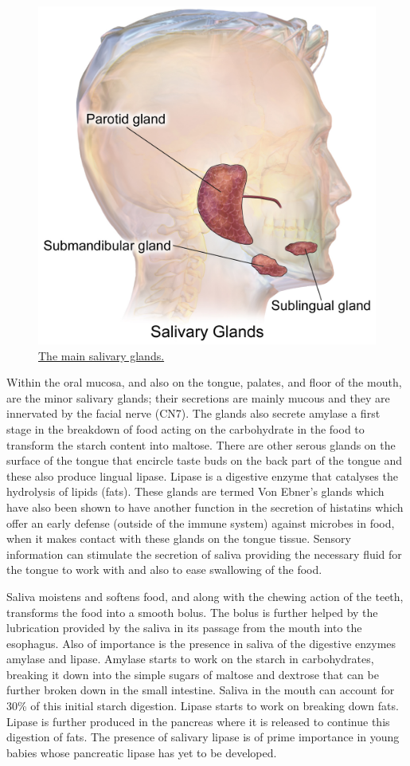 \begin{figure}

{\centering \includegraphics[width=0.7\linewidth]{./figures/digestive/Blausen_0780_SalivaryGlands} 

}

\caption{\href{https://en.wikipedia.org/wiki/Human_digestive_system\#/media/File:Blausen_0780_SalivaryGlands.png}{The main salivary glands.}}\label{fig:salivaryglands}
\end{figure}

Within the oral mucosa, and also on the tongue, palates, and floor of the mouth, are the minor salivary glands; their secretions are mainly mucous and they are innervated by the facial nerve (CN7). The glands also secrete amylase a first stage in the breakdown of food acting on the carbohydrate in the food to transform the starch content into maltose. There are other serous glands on the surface of the tongue that encircle taste buds on the back part of the tongue and these also produce lingual lipase. Lipase is a digestive enzyme that catalyses the hydrolysis of lipids (fats). These glands are termed Von Ebner's glands which have also been shown to have another function in the secretion of histatins which offer an early defense (outside of the immune system) against microbes in food, when it makes contact with these glands on the tongue tissue. Sensory information can stimulate the secretion of saliva providing the necessary fluid for the tongue to work with and also to ease swallowing of the food.

Saliva moistens and softens food, and along with the chewing action of the teeth, transforms the food into a smooth bolus. The bolus is further helped by the lubrication provided by the saliva in its passage from the mouth into the esophagus. Also of importance is the presence in saliva of the digestive enzymes amylase and lipase. Amylase starts to work on the starch in carbohydrates, breaking it down into the simple sugars of maltose and dextrose that can be further broken down in the small intestine. Saliva in the mouth can account for 30\% of this initial starch digestion. Lipase starts to work on breaking down fats. Lipase is further produced in the pancreas where it is released to continue this digestion of fats. The presence of salivary lipase is of prime importance in young babies whose pancreatic lipase has yet to be developed.

